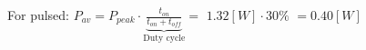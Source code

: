 \documentclass[preview]{standalone}
\begin{document}
\begin{center}
For pulsed: $P_{av} = P_{peak} \cdot \underbrace{\frac{t_{on}}{t_{on}+t_{off}}}_{\text{Duty cycle}}=$ $1.32 [W] \cdot 30 \%$ $= 0.40 [W]$
\end{center}
\end{document}
